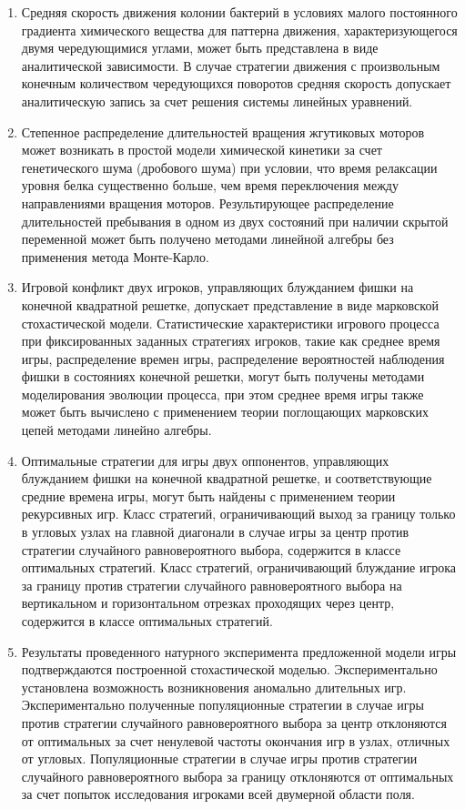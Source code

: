 {}
\begin{enumerate}[beginpenalty=10000] %
    \item Средняя скорость движения колонии бактерий в условиях малого постоянного градиента химического вещества для паттерна движения, характеризующегося двумя чередующимися углами, может быть представлена в виде аналитической зависимости. В случае стратегии движения с произвольным конечным количеством чередующихся поворотов средняя скорость допускает аналитическую запись за счет решения системы линейных уравнений.
    \item Степенное распределение длительностей вращения жгутиковых моторов может возникать в простой модели химической кинетики за счет генетического шума (дробового шума) при условии, что время релаксации уровня белка существенно больше, чем время переключения между направлениями вращения моторов. Результирующее распределение длительностей пребывания в одном из двух состояний при наличии скрытой переменной может быть получено методами линейной алгебры без применения метода Монте-Карло. 
    \item Игровой конфликт двух игроков, управляющих блужданием фишки на конечной квадратной решетке, допускает представление в виде марковской стохастической модели. Статистические характеристики игрового процесса при фиксированных заданных стратегиях игроков, такие как среднее время игры, распределение времен игры, распределение вероятностей наблюдения фишки в состояниях конечной решетки, могут быть получены методами моделирования эволюции процесса, при этом среднее время игры также может быть вычислено с применением теории поглощающих марковских цепей методами линейно алгебры.
    \item Оптимальные стратегии для игры двух оппонентов, управляющих блужданием фишки на конечной квадратной решетке, и соответствующие средние времена игры, могут быть найдены с применением теории рекурсивных игр. Класс стратегий, ограничивающий выход за границу только в угловых узлах на главной диагонали в случае игры за центр против стратегии случайного равновероятного выбора, содержится в классе оптимальных стратегий. Класс стратегий, ограничивающий блуждание игрока за границу против стратегии случайного равновероятного выбора на вертикальном и горизонтальном отрезках проходящих через центр, содержится в классе оптимальных стратегий.
    \item Результаты проведенного натурного эксперимента предложенной модели игры подтверждаются построенной стохастической моделью. Экспериментально установлена возможность возникновения аномально длительных игр. Экспериментально полученные популяционные стратегии в случае игры против стратегии случайного равновероятного выбора за центр отклоняются от оптимальных за счет ненулевой частоты окончания игр в узлах, отличных от угловых. Популяционные стратегии в случае игры против стратегии случайного равновероятного выбора за границу отклоняются от оптимальных за счет попыток исследования игроками всей двумерной области поля. 
\end{enumerate}

